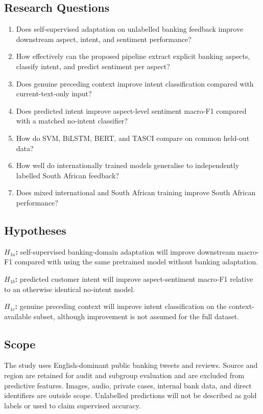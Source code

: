 \documentclass[11pt,a4paper]{article}
\begin{document}
\subsection{Research Questions}
\begin{enumerate}[label=\arabic*.]
\item Does self-supervised adaptation on unlabelled banking feedback improve downstream aspect, intent, and sentiment performance?
\item How effectively can the proposed pipeline extract explicit banking aspects, classify intent, and predict sentiment per aspect?
\item Does genuine preceding context improve intent classification compared with current-text-only input?
\item Does predicted intent improve aspect-level sentiment macro-F1 compared with a matched no-intent classifier?
\item How do SVM, BiLSTM, BERT, and TASCI compare on common held-out data?
\item How well do internationally trained models generalise to independently labelled South African feedback?
\item Does mixed international and South African training improve South African performance?
\end{enumerate}

\subsection{Hypotheses}
\textbf{$H_{1a}$:} self-supervised banking-domain adaptation will improve downstream macro-F1 compared with using the same pretrained model without banking adaptation.

\textbf{$H_{1b}$:} predicted customer intent will improve aspect-sentiment macro-F1 relative to an otherwise identical no-intent model.

\textbf{$H_{1c}$:} genuine preceding context will improve intent classification on the context-available subset, although improvement is not assumed for the full dataset.

\subsection{Scope}
The study uses English-dominant public banking tweets and reviews. Source and region are retained for audit and subgroup evaluation and are excluded from predictive features. Images, audio, private cases, internal bank data, and direct identifiers are outside scope. Unlabelled predictions will not be described as gold labels or used to claim supervised accuracy.
\end{document}
